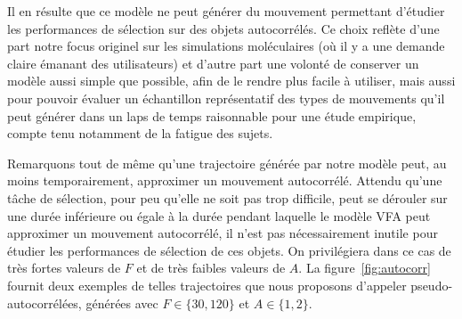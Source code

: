 	Il en résulte que ce modèle ne peut générer du mouvement permettant d'étudier les performances de sélection sur des objets autocorrélés. Ce choix reflète d'une part notre focus originel sur les simulations moléculaires (où il y a une demande claire émanant des utilisateurs) et d'autre part une volonté de conserver un modèle aussi simple que possible, afin de le rendre plus facile à utiliser, mais aussi pour pouvoir évaluer un échantillon représentatif des types de mouvements qu'il peut générer dans un laps de temps raisonnable pour une étude empirique, compte tenu notamment de la fatigue des sujets.
    
	Remarquons tout de même qu'une trajectoire générée par notre modèle peut, au moins temporairement, approximer un mouvement autocorrélé. Attendu qu'une tâche de sélection, pour peu qu'elle ne soit pas trop difficile, peut se dérouler sur une durée inférieure ou égale à la durée pendant laquelle le modèle VFA peut approximer un mouvement autocorrélé, il n'est pas nécessairement inutile pour étudier les performances de sélection de ces objets. On privilégiera dans ce cas de très fortes valeurs de $F$ et de très faibles valeurs de $A$. La figure~\ref{fig:autocorr} fournit deux exemples de telles trajectoires que nous proposons d'appeler pseudo-autocorrélées, générées avec $F \in \{30,120\}$ et $A \in \{1,2\}$.
	
